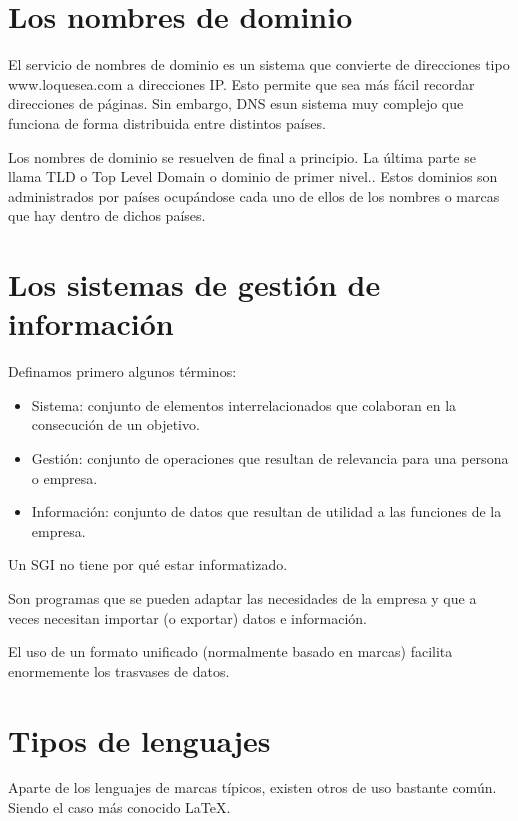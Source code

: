 \documentclass[letterpaper,10pt,spanish]{sphinxmanual}
\begin{document}
\section{Los nombres de dominio}
\label{tema1:los-nombres-de-dominio}
El servicio de nombres de dominio es un sistema que convierte de direcciones tipo www.loquesea.com a direcciones IP. Esto permite que sea más fácil recordar direcciones de páginas. Sin embargo, DNS esun sistema muy complejo que funciona de forma distribuida entre distintos países.

Los nombres de dominio se resuelven de final a principio. La última parte se llama TLD o Top Level Domain o dominio de primer nivel.. Estos dominios son administrados por países ocupándose cada uno de ellos de los nombres o marcas que hay dentro de dichos países.


\section{Los sistemas de gestión de información}
\label{tema1:los-sistemas-de-gestion-de-informacion}
Definamos primero algunos términos:
\begin{itemize}
\item {} 
Sistema: conjunto de elementos interrelacionados que colaboran en la consecución de un objetivo.

\item {} 
Gestión: conjunto de operaciones que resultan de relevancia para una persona o empresa.

\item {} 
Información: conjunto de datos que resultan de utilidad a las funciones de la empresa.

\end{itemize}

Un SGI no tiene por qué estar informatizado.

Son programas que se pueden adaptar las necesidades de la empresa y que a veces necesitan
importar (o exportar) datos e información.

El uso de un formato unificado (normalmente basado en marcas) facilita enormemente los
trasvases de datos.


\section{Tipos de lenguajes}
\label{tema1:tipos-de-lenguajes}
Aparte de los lenguajes de marcas típicos, existen otros de uso bastante común. Siendo el caso más conocido LaTeX.
\end{document}
